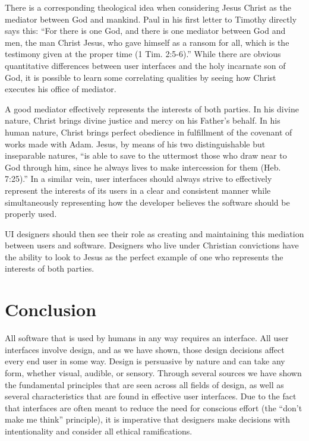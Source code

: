 \documentclass[12pt, oneside]{article}
\begin{document}
There is a corresponding theological idea when considering Jesus Christ as the mediator between God and mankind. Paul in his first letter to Timothy directly says this: ``For there is one God, and there is one mediator between God and men, the man Christ Jesus, who gave himself as a ransom for all, which is the testimony given at the proper time (1 Tim. 2:5-6).'' While there are obvious quantitative differences between user interfaces and the holy incarnate son of God, it is possible to learn some correlating qualities by seeing how Christ executes his office of mediator.

A good mediator effectively represents the interests of both parties. In his divine nature, Christ brings divine justice and mercy on his Father's behalf. In his human nature, Christ brings perfect obedience in fulfillment of the covenant of works made with Adam. Jesus, by means of his two distinguishable but inseparable natures, ``is able to save to the uttermost those who draw near to God through him, since he always lives to make intercession for them (Heb. 7:25).'' In a similar vein, user interfaces should always strive to effectively represent the interests of its users in a clear and consistent manner while simultaneously representing how the developer believes the software should be properly used.

UI designers should then see their role as creating and maintaining this mediation between users and software. Designers who live under Christian convictions have the ability to look to Jesus as the perfect example of one who represents the interests of both parties.

\section{Conclusion}

All software that is used by humans in any way requires an interface. All user interfaces involve design, and as we have shown, those design decisions affect every end user in some way. Design is persuasive by nature and can take any form, whether visual, audible, or sensory. Through several sources we have shown the fundamental principles that are seen across all fields of design, as well as several characteristics that are found in effective user interfaces. Due to the fact that interfaces are often meant to reduce the need for conscious effort (the ``don't make me think'' principle), it is imperative that designers make decisions with intentionality and consider all ethical ramifications.
\end{document}

